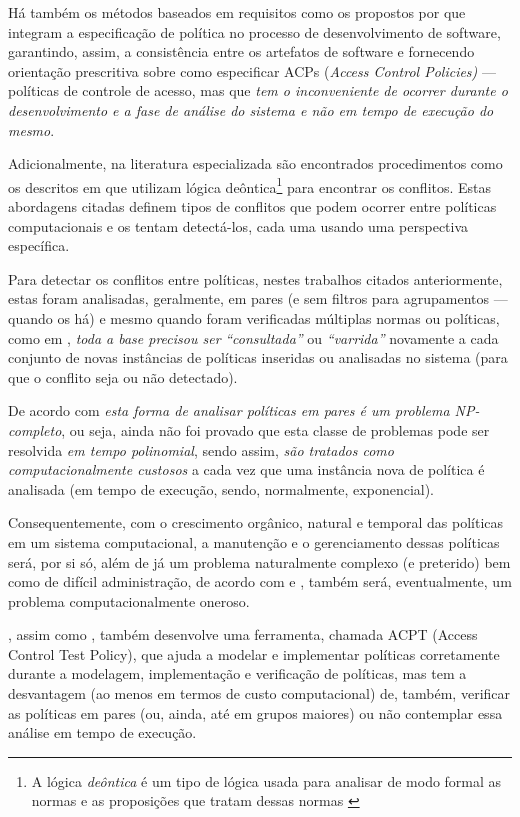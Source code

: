 \documentclass[
	12pt,				%
	openright,			%
	oneside,			%
	a4paper,			%
	english,			%
	french,				%
	spanish,			%
	brazil				%
	]{abntex2}
\begin{document}
Há também os métodos baseados em requisitos como os propostos por  que integram a especificação de política no processo de desenvolvimento de software, garantindo, assim, a consistência entre os artefatos de software e fornecendo orientação prescritiva sobre como especificar ACPs (\textit{Access Control Policies)} --- políticas de controle de acesso, mas que\textit{ tem o inconveniente de ocorrer durante o desenvolvimento e a fase de análise do sistema e não em tempo de execução do mesmo}.

Adicionalmente, na literatura especializada são encontrados procedimentos como os descritos em  que utilizam lógica deôntica\footnote{A lógica \textit{deôntica} é um tipo de lógica usada para analisar de modo formal as normas e as proposições que tratam dessas normas \cite{eduardo2017}} para encontrar os conflitos. Estas abordagens citadas definem tipos de conflitos que podem ocorrer entre políticas computacionais e os tentam detectá-los, cada uma usando uma perspectiva específica. 

Para detectar os conflitos entre políticas, nestes trabalhos citados anteriormente, estas foram analisadas, geralmente, em pares (e sem filtros para agrupamentos --- quando os há) e mesmo quando foram verificadas múltiplas normas ou políticas, como em , \textit{toda a base precisou ser} \textit{``consultada''} ou \textit{``varrida''} novamente a cada conjunto de novas instâncias de políticas inseridas ou analisadas no sistema (para que o conflito seja ou não detectado).

De acordo com  \textit{esta forma de analisar políticas em pares é um problema NP-completo}, ou seja, ainda não foi provado que esta classe de problemas pode ser resolvida \textit{em tempo polinomial}, sendo assim, \textit{são tratados como computacionalmente custosos} a cada vez que uma instância nova de política é analisada (em tempo de execução, sendo, normalmente, exponencial). 

Consequentemente, com o crescimento orgânico, natural e temporal das políticas em um sistema computacional, a manutenção e o gerenciamento dessas políticas será, por si só, além de já um problema naturalmente complexo (e preterido) bem como de difícil administração, de acordo com  e , também será, eventualmente, um problema computacionalmente oneroso.

, assim como , também desenvolve uma ferramenta, chamada ACPT (Access Control Test Policy), que ajuda a modelar e implementar políticas corretamente durante a modelagem, implementação e verificação de políticas, mas tem a desvantagem (ao menos em termos de custo computacional) de, também, verificar as políticas em pares (ou, ainda, até em grupos maiores) ou não contemplar essa análise em tempo de execução.
\end{document}
